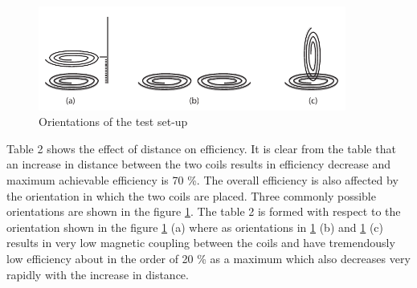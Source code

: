 \begin{figure}[h!]
\centering
\includegraphics[width=0.9\textwidth]{dimension.pdf}
\caption{Orientations of the test set-up}
\label{fig:dimension}
\end{figure}


Table 2 shows the effect of distance on efficiency. It is clear from the table that an increase in distance between the two coils results in efficiency decrease and maximum achievable efficiency is 70 \%.  The overall efficiency is also affected by the orientation in which the two coils are placed. Three commonly possible orientations are shown in the figure \ref{fig:dimension}. The table 2 is formed with respect to the orientation shown in the figure \ref{fig:dimension} (a) where as orientations in \ref{fig:dimension} (b) and \ref{fig:dimension} (c) results in very low magnetic coupling between the coils and have tremendously low efficiency about in the order of 20 \% as a maximum which also decreases very rapidly with the increase in distance.


